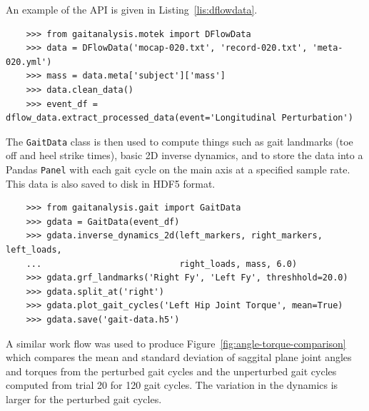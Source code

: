 \documentclass[10pt,a4paper,twocolumn]{article}
\begin{document}
An example of the API is given in Listing~\ref{lis:dflowdata}.

\begin{listing*}
  \begin{verbatim}
    >>> from gaitanalysis.motek import DFlowData
    >>> data = DFlowData('mocap-020.txt', 'record-020.txt', 'meta-020.yml')
    >>> mass = data.meta['subject']['mass']
    >>> data.clean_data()
    >>> event_df = dflow_data.extract_processed_data(event='Longitudinal Perturbation')
  \end{verbatim}
  \cprotect\caption{Python interpreter session showing how one could load a
    trial into memory, extract the subject's mass from the meta data, run the
    data cleaning process, and finally extract a Pandas \verb|DataFrame|
    containing all of the time histories for a specific event in the trial.}
  \label{lis:dflowdata}
\end{listing*}

The \verb|GaitData| class is then used to compute things such as gait landmarks
(toe off and heel strike times), basic 2D inverse dynamics, and to store the
data into a Pandas \verb|Panel| with each gait cycle on the main axis at a
specified sample rate. This data is also saved to disk in HDF5 format.

\begin{listing*}
  \begin{verbatim}
    >>> from gaitanalysis.gait import GaitData
    >>> gdata = GaitData(event_df)
    >>> gdata.inverse_dynamics_2d(left_markers, right_markers, left_loads,
    ...                           right_loads, mass, 6.0)
    >>> gdata.grf_landmarks('Right Fy', 'Left Fy', threshhold=20.0)
    >>> gdata.split_at('right')
    >>> gdata.plot_gait_cycles('Left Hip Joint Torque', mean=True)
    >>> gdata.save('gait-data.h5')
  \end{verbatim}
  \cprotect\caption{Python interpreter session showing how one could compute
    the inverse dynamics (joint angles and torques), identify the gait
    landmarks (e.g. heel strikes), split the data with respect to the gait
    landmarks in a Pandas \verb|Panel|, plot the mean and standard deviation of
    one time history with respect to the gait cycles, and save the data to disk.}
  \label{lis:dflowdata}
\end{listing*}

A similar work flow was used to produce Figure~\ref{fig:angle-torque-comparison}
which compares the mean and standard deviation of saggital plane joint angles
and torques from the perturbed gait cycles and the unperturbed gait cycles
computed from trial 20 for 120 gait cycles. The variation in the dynamics is
larger for the perturbed gait cycles.
\end{document}
